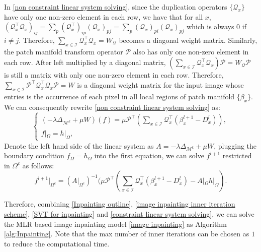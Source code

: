 \documentclass[letterpaper,10pt]{article}
\begin{document}
In \eqref{non constraint linear system solving}, since the duplication operators $\{\mathcal{Q}_x\}$ have only one non-zero element in each row, we have that for all $x$, $(\mathcal{Q}_x^{\top}\mathcal{Q}_x)_{ij} = \sum_{p} (\mathcal{Q}_x^{\top})_{ip} (\mathcal{Q}_x)_{pj}=\sum_{p} (\mathcal{Q}_x)_{pi} (\mathcal{Q}_x)_{pj}$ which is always $0$ if $i \neq j$. Therefore, $\sum\limits_{x \in \mathscr{I}} \mathcal{Q}_x^{\top}\mathcal{Q}_x = W_{\mathcal{Q}}$ becomes a diagonal weight matrix. Similarly, the patch manifold transform operator $\mathcal{P}$ also has only one non-zero element in each row. After left multiplied by a diagonal matrix, $\left( \sum\limits_{x \in \mathscr{I}} \mathcal{Q}_x^{\top}\mathcal{Q}_x \right) \mathcal{P}= W_{\mathcal{Q}}  \mathcal{P}$ is still a matrix with only one non-zero element in each row. Therefore, $\sum\limits_{x \in \mathscr{I}} \mathcal{P}^{\top}\mathcal{Q}_x^{\top}\mathcal{Q}_x \mathcal{P} = W$ is a diagonal weight matrix for the input image whose entries is the occurrence of each pixel in all local regions of patch manifold $\{\beta_x\}$. We can consequently rewrite \eqref{non constraint linear system solving} as:
\begin{equation}\label{linear system solving}
\begin{cases}
 \left (-\lambda \Delta_{\mathcal{M}^k} +  \mu W \right)(f) = \mu \mathcal{P}^{\top} \left (  \sum\limits_{x \in \mathscr{I}}  \mathcal{Q}_x^{\top}( {\beta}_x^{l+1} -D_x^{l}) \right ),\\
f|_\Omega = h|_\Omega,
\end{cases}
\end{equation}
Denote the left hand side of the linear system as $A =  - \lambda \Delta_{\mathcal{M}^k} + \mu W$, plugging the boundary condition $f_\Omega = h_\Omega$ into the first equation, we can solve $f^{l+1}$ restricted in $\Omega^c$ as follows:
\begin{equation}\label{constraint linear system solving}
f^{l+1}|_{\Omega^c} =  (A|_{\Omega^c})^{-1} (\mu \mathcal{P}^{\top} ( \sum\limits_{x \in \mathscr{I}}  \mathcal{Q}_x^{\top}( {\beta}_x^{l+1} -D_x^{l}) - A|_\Omega h|_\Omega).
\end{equation}

Therefore, combining \eqref{Inpainting outline}, \eqref{image inpainting inner iteration scheme}, \eqref{SVT for inpainting} and \eqref{constraint linear system solving}, we can solve the MLR based image inpainting model \eqref{image inpainting} as  Algorithm \ref{alg:Inpainting}. Note that the max number of inner iterations can be chosen as $1$ to reduce the computational time.
\end{document}
